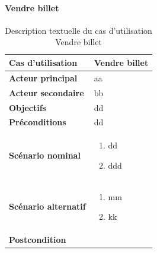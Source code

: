        \paragraph[Vendre billet]{Vendre billet}
        \begin{longtable}{p{4cm} p{9cm}}
            \caption{Description textuelle du cas d’utilisation Vendre billet}
            \label{table:usecaseVendreBill}
            \\\hline\hline
                \textbf{Cas d’utilisation} & \textbf{Vendre billet}
            \\\hline\hline
                    \textbf{Acteur principal} & aa
                \\
                    \textbf{Acteur secondaire} & bb
                \\
                    \textbf{Objectifs} & dd
                \\
                    \textbf{Préconditions} & dd
                \\
                \textbf{Scénario nominal} &
                    \begin{enumerate}[leftmargin=*]
                        \item dd
                        \item ddd
                    \end{enumerate}
                \\
                \textbf{Scénario alternatif} &
                    \begin{enumerate}[leftmargin=*]
                        \item mm
                        \item kk
                    \end{enumerate}
                \\
                \textbf{Postcondition}
            \\\bottomrule
        \end{longtable}

